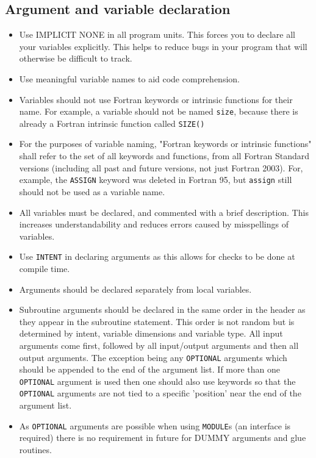 \subsection{Argument and variable declaration}\label{sec:declare}
\begin{itemize}
\item Use IMPLICIT NONE in all program units.
This forces you to declare all your variables explicitly.
This helps to reduce bugs in your program that will otherwise
be difficult to track.
\item Use meaningful variable names to aid code comprehension.
\item Variables should not use Fortran keywords or intrinsic functions for their name.
For example, a variable should not be named \verb|size|,
because there is already a Fortran intrinsic function called \verb|SIZE()|
\item For the purposes of variable naming, "Fortran keywords or intrinsic functions"
shall refer to the set of all keywords and functions, from all Fortran Standard versions
(including all past and future versions, not just Fortran 2003). For, example, the
\verb|ASSIGN| keyword was deleted in Fortran 95, but \verb|assign| still should not
be used as a variable name.
\item All variables must be declared, and commented with a brief description.
This increases understandability and reduces errors caused by misspellings of variables.
\item Use \verb|INTENT| in declaring arguments as this allows
for checks to be done at compile time.
\item Arguments should be declared separately from local variables.
\item Subroutine arguments should be declared in the same order in the header
as they appear in the subroutine statement.
This order is not random but is determined by intent,
variable dimensions and variable type.
All input arguments come first, followed by all input/output arguments and then
all output arguments. The exception being any \verb|OPTIONAL| arguments which should
be appended to the end of the argument list. If more than one
\verb|OPTIONAL| argument is used then one should also use keywords
so that the \verb|OPTIONAL| arguments are not tied to a specific 'position'
near the end of the argument list.
\item As \verb|OPTIONAL| arguments are possible when using \verb|MODULE|s (an interface is required) there is no requirement in
future for DUMMY arguments and glue routines.

\end{itemize}
